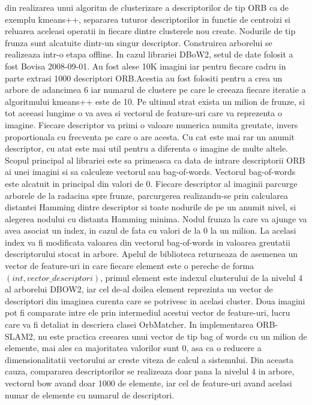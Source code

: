 \documentclass[12pt,a4paper]{report}
\begin{document}
din realizarea unui algoritm de clusterizare a descriptorilor de tip ORB ca de exemplu 
kmeans++, separarea tuturor descriptorilor in functie de centroizi si reluarea aceleasi
operatii in fiecare dintre clusterele nou create. Nodurile de tip frunza sunt alcatuite 
dintr-un singur descriptor. Construirea arborelui se realizeaza intr-o etapa offline. In cazul
librariei DBoW2, setul de date folosit a fost Bovisa 2008{-}09{-}01. Au fost alese 10K imagini
iar pentru fiecare cadru in parte extrasi 1000 descriptori ORB.\@ Acestia au fost folositi 
pentru a crea un arbore de adancimea 6 iar numarul de clustere pe care le creeaza fiecare 
iteratie a algoritmului kmeans++ este de 10. Pe ultimul strat exista un milion de frunze, si 
tot aceeasi lungime o va avea si vectorul de feature-uri care va reprezenta o imagine. Fiecare
descriptor va primi o valoare numerica numita greutate, invers proportionala cu frecventa pe 
care o are acesta. Cu cat este mai rar un anumit descriptor, cu atat este mai util pentru a 
diferenta o imagine de multe altele. Scopul principal al librariei este sa primeasca ca data
de intrare descriptorii ORB ai unei imagini si sa calculeze vectorul sau bag-of-words.
Vectorul bag-of-words este alcatuit in principal din valori de 0. Fiecare descriptor al 
imaginii parcurge arborele de la radacina spre frunze, parcurgerea realizandu-se prin 
calcularea distantei Hamming dintre descriptor si toate nodurile de pe un anumit nivel, 
si alegerea nodului cu distanta Hamming minima. Nodul frunza la care va ajunge va avea asociat
un index, in cazul de fata cu valori de la 0 la un milion. La acelasi index va fi modificata
valoarea din vectorul bag-of-words in valoarea greutatii descriptorului stocat in arbore.
Apelul de biblioteca returneaza de asemenea un vector de feature-uri in care fiecare element
este o pereche de forma $ (int, vector\_descriptori) $, primul element este indexul 
clusterului de la nivelul 4 al arborelui DBOW2, iar cel de-al doilea element reprezinta un 
vector de descriptori din imaginea curenta care se potrivesc in acelasi cluster. Doua imagini pot
fi comparate intre ele prin intermediul acestui vector de feature-uri, lucru care va fi detaliat
in descriera clasei OrbMatcher. In implementarea ORB-SLAM2, nu este practica creearea unui vector
de tip bag of words cu un milion de elemente, mai ales ca majoritatea valorilor sunt 0, asa ca o
reducere a dimensionalitatii vectorului ar creste viteza de calcul a sistemului. Din aceasta 
cauza, compararea descriptorilor se realizeaza doar pana la nivelul 4 in arbore, vectorul bow 
avand doar 1000 de elemente, iar cel de feature-uri avand acelasi numar de elemente cu numarul de 
descriptori. 
\end{document}

